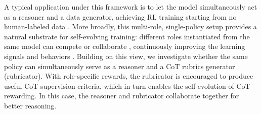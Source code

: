 A typical application under this framework is to let the model simultaneously act as a reasoner and a data generator, achieving RL training starting from no human-labeled data \cite{AbsoluteZero, AlphaZero, SSP}. 
More broadly, this multi-role, single-policy setup provides a natural substrate for self-evolving training: different roles instantiated from the same model can compete \cite{AbsoluteZero, SPICE} or collaborate \cite{Alignmen-Waltz, SPIRAL}, continuously improving the learning signals and behaviors \cite{MAS-Survey}.
Building on this view, we investigate whether the same policy can simultaneously serve as a reasoner and a CoT rubrics generator (\ie rubricator). 
With role-specific rewards, the rubricator is encouraged to produce useful CoT supervision criteria, which in turn enables the self-evolution of CoT rewarding. 
In this case, the reasoner and rubricator collaborate together for better reasoning.


